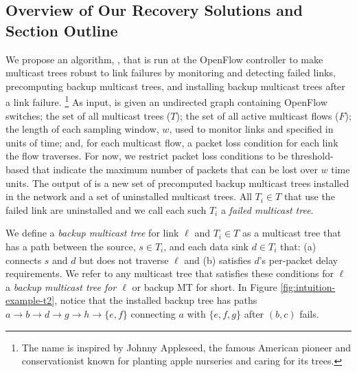 \subsection{Overview of Our Recovery Solutions and Section Outline}
\label{subsec:mdr}

We propose an algorithm, \mdrs, that is run at the OpenFlow controller to make multicast trees robust to link failures by monitoring and detecting failed links, precomputing backup multicast trees, and installing backup multicast trees after a link failure.
\footnote{The name \mdr is inspired by Johnny Appleseed, the famous American pioneer and conservationist known for planting apple nurseries and caring for its trees. }
As input, \mdr is given an undirected graph containing OpenFlow switches; the set of all multicast trees ($T$); the set of all active multicast flows ($F$); the length of each sampling window, 
$w$, used to monitor links and specified in units of time; and, for each multicast flow, a packet loss condition for each link the flow traverses. For now, we restrict packet loss conditions 
to be threshold-based that indicate the maximum number of packets that can be lost over $w$ time units. 
The output of \mdr is a new set of precomputed backup multicast trees installed in the network and a set of uninstalled multicast trees.   All $T_i \in T$ that use the failed link are uninstalled and we call each such $T_i$ a \emph{failed multicast tree}.

We define a \emph{backup multicast tree} for link $\ell$ and $T_i \in T$ as a multicast tree that has 
a path between the source, $s \in T_i$, and each data sink $d \in T_i$ that: (a) connects $s$ and $d$ but does not traverse $\ell$ and 
(b) satisfies $d$'s per-packet delay requirements.  We refer to any multicast tree that satisfies these conditions for $\ell$ a \emph{backup multicast tree for $\ell$} or backup MT for short.
In Figure \ref{fig:intuition-example-t2}, notice that the installed backup tree has paths $a \rightarrow b \rightarrow d \rightarrow g \rightarrow h \rightarrow \{e,f\}$ connecting $a$ with $\{e,f,g\}$ after $(b,c)$ fails.




